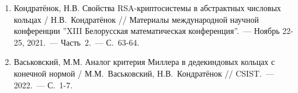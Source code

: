 \documentclass[_00_dissertation.tex]{subfiles}
\begin{document}
\begin{enumerate}
    \item \label{source:XIII_Belarussian_math_conference_2021}
    Кондратёнок, Н.В. Свойства RSA-криптосистемы в абстрактных числовых кольцах / Н.В.~Кондратёнок // Материалы международной научной конференции ''XIII Белорусская математическая конференция''.~--- Ноябрь 22-25, 2021.~--- Часть~2.~--- С.~63-64.

    \item \label{source:CSIST_2022}
    Васьковский, М.М. Аналог критерия Миллера в дедекиндовых кольцах с конечной нормой / М.М.~Васьковский, Н.В.~Кондратёнок // CSIST.~--- 2022.~--- С.~1-7.

\end{enumerate}

\end{document}
